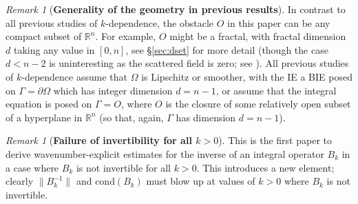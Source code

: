 \documentclass{birkjour}
\theoremstyle{definition}
\theoremstyle{remark}
\newtheorem{remark}[theorem]{Remark}
\numberwithin{equation}{section}
\newcommand{\R}{\mathbb{R}}
\newcommand{\cond}{\mathrm{cond}}
\begin{document}
\begin{remark}[\bf Generality of the geometry in previous results] In contrast to all previous studies of $k$-dependence, the obstacle $O$ in this paper can be any compact subset of $\R^n$. For example, $O$ might be a fractal,  with fractal dimension $d$ taking any value in $[0,n]$, see \S\ref{sec:dset} for more detail (though the case $d<n-2$ is uninteresting as the scattered field is  zero; see  \cite[Rem.~3.5]{caetano2025integral}).  All previous studies of $k$-dependence assume that $\Omega$ is Lipschitz or smoother, with the IE a BIE posed on $\Gamma=\partial \Omega$ which has integer dimension $d=n-1$, or assume \cite{Ha-Du:90,Ha-Du:92,CWHewett2015} that the integral equation is posed on $\Gamma=O$, where $O$ is the closure of some relatively open subset of a hyperplane in $\R^n$ (so that, again, $\Gamma$ has dimension $d=n-1$).
\end{remark}

\begin{remark}[\bf Failure of invertibility for all $k>0$] This is the first paper to derive wavenumber-explicit estimates for the inverse of an integral operator $B_k$ in a case where $B_k$ is not invertible for all $k>0$. This introduces a new element; clearly $\|B_k^{-1}\|$ and $\cond(B_k)$ must blow up at values of $k>0$ where $B_k$ is not invertible.
\end{remark}
\end{document}
